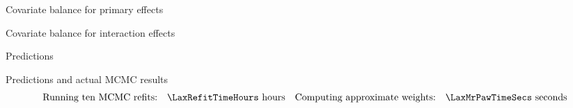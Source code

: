 


\begin{frame}{Covariate balance for primary effects}
\LaxImbalancePrimary{}
\end{frame}


\begin{frame}{Covariate balance for interaction effects}
\LaxImbalanceInteraction{}
\end{frame}




\begin{frame}[t]{Predictions}
    \LaxPredictionFigOne{}
\end{frame}


\begin{frame}[t]{Predictions and actual MCMC results}
    \LaxPredictionFigTwo{}
    \vspace{-3em}
    $$
    \begin{aligned}
        \textrm{Running ten MCMC refits:}\quad & \LaxRefitTimeHours \textrm{ hours} &
        \textrm{Computing approximate weights:}\quad &\LaxMrPawTimeSecs \textrm{ seconds}\\
    \end{aligned}
    $$
\end{frame}







\def\res{\varepsilon}
\def\w{w}
\def\wtil{\tilde{\w}}
\def\reshat{\hat{\res}}

\def\methodrow#1#2#3{
\begin{minipage}[t]{0.15\textwidth}
    \centering
    #1
\end{minipage}
\hfill
\begin{minipage}[t]{0.4\textwidth}
    \centering
    \vspace{-2em}
    #2
    \pause
\end{minipage}
\hfill
\begin{minipage}[t]{0.4\textwidth}
    \centering
    \vspace{-2em}
    #3
    \pause
\end{minipage}
}


